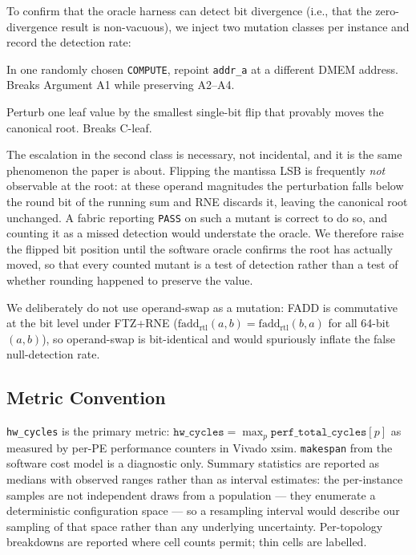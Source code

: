 \documentclass[journal,10pt]{IEEEtran}
\theoremstyle{plain}
\theoremstyle{definition}
\theoremstyle{remark}
\newcommand{\fadd}{\ensuremath{\mathrm{fadd}_{\mathrm{rtl}}}}
\newcommand{\sv}[1]{\texttt{#1}}
\begin{document}
To confirm that the oracle harness can detect bit divergence (i.e., that
the zero-divergence result is non-vacuous), we inject two mutation
classes per instance and record the detection rate:

\begin{description}[leftmargin=1.3em,style=nextline]
\item[Address substitution.] In one randomly chosen \texttt{COMPUTE},
  repoint \texttt{addr\_a} at a different DMEM address. Breaks Argument A1
  while preserving A2--A4.
\item[Leaf corruption.] Perturb one leaf value by the smallest single-bit
  flip that provably moves the canonical root. Breaks \textsf{C-leaf}.
\end{description}

The escalation in the second class is necessary, not incidental, and it is
the same phenomenon the paper is about. Flipping the mantissa LSB is
frequently \emph{not} observable at the root: at these operand magnitudes the
perturbation falls below the round bit of the running sum and RNE discards
it, leaving the canonical root unchanged. A fabric reporting \sv{PASS} on
such a mutant is correct to do so, and counting it as a missed detection
would understate the oracle. We therefore raise the flipped bit position
until the software oracle confirms the root has actually moved, so that every
counted mutant is a test of detection rather than a test of whether rounding
happened to preserve the value.

We deliberately do not use operand-swap as a mutation: FADD is
commutative at the bit level under FTZ+RNE ($\fadd(a,b) = \fadd(b,a)$
for all 64-bit $(a,b)$), so operand-swap is bit-identical and would
spuriously inflate the false null-detection rate.

\subsection{Metric Convention}\label{sec:method-metric}

\sv{hw\_cycles} is the primary metric: $\sv{hw\_cycles} = \max_p
\sv{perf\_total\_cycles}[p]$ as measured by per-PE performance counters
in Vivado xsim. \sv{makespan}
from the software cost model is a diagnostic only. Summary statistics are
reported as medians with observed ranges rather than as interval estimates:
the per-instance samples are not independent draws from a population --- they
enumerate a deterministic configuration space --- so a resampling interval
would describe our sampling of that space rather than any underlying
uncertainty. Per-topology breakdowns are reported where cell counts permit;
thin cells are labelled.
\end{document}

